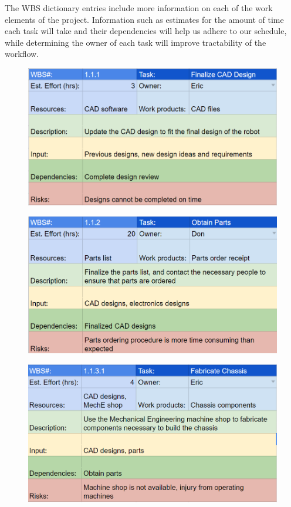\clearpage

The WBS dictionary entries include more information on each of the work elements of the project. Information such as estimates for the amount of time each task will take and their dependencies will help us adhere to our schedule, while determining the owner of each task will improve tractability of the workflow.

\begin{figure}[!ht]
\centering
\includegraphics[width=0.98\columnwidth]{wbs_schedule/wbs_dict_hw1.PNG}
\label{fig:hw1}
\end{figure}
\begin{figure}[!ht]
\centering
\includegraphics[width=0.98\columnwidth]{wbs_schedule/wbs_dict_hw2.PNG}
\label{fig:hw2}
\end{figure}
\begin{figure}[!ht]
\centering
\includegraphics[width=0.98\columnwidth]{wbs_schedule/wbs_dict_hw3.PNG}
\label{fig:hw3}
\end{figure}
